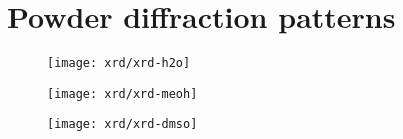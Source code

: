 
\FloatBarrier%
\section{Powder diffraction patterns}\label{appx:def:tga}

\begin{figure}
    \centering
    
    \texttt{[image: xrd/xrd-h2o]}

    \texttt{[image: xrd/xrd-meoh]}

    \texttt{[image: xrd/xrd-dmso]}
\end{figure}
